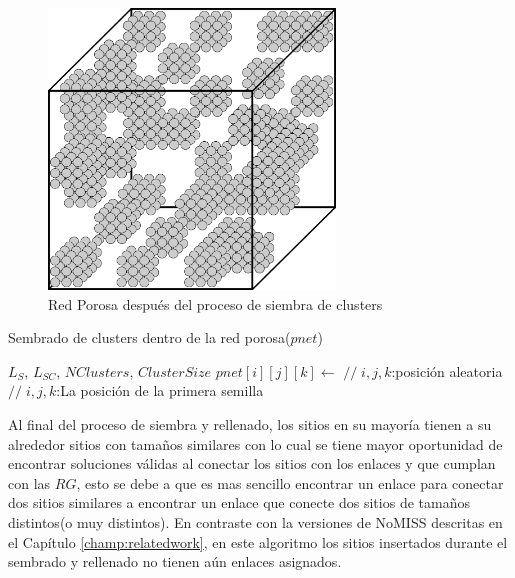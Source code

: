 \begin{figure}[h]
\centering
\includegraphics[width=3.0in]{img/cluster1.pdf}
\caption{Red Porosa después del proceso de siembra de clusters}
\label{fig:cluster1}
\end{figure}

\begin{algorithm}
\caption{Sembrado de clusters dentro de la red porosa($pnet$)}\label{alg:seedingalg}
\begin{algorithmic}[1]
\Require $L_S$, $L_{SC}$, $NClusters$, $ClusterSize$ 
\State $pnet[i][j][k] \gets $  {$//\;i,j,k$:posición aleatoria}
\State {}
\EndFor
\EndFor
{} {$//\;i,j,k$:La posición de la primera semilla}
	\State {}
\EndWhile
\end{algorithmic}
\end{algorithm}

Al final del proceso de siembra y rellenado, los sitios en su mayoría tienen a su alrededor sitios con tamaños similares con lo cual se tiene mayor oportunidad de encontrar soluciones válidas al conectar los sitios con los enlaces y que cumplan con las $RG$, esto se debe a que es mas sencillo encontrar un enlace para conectar dos sitios similares a encontrar un enlace que conecte dos sitios de tamaños distintos(o muy distintos). En contraste con la versiones de NoMISS descritas en el Capítulo \ref{champ:relatedwork}, en este algoritmo los sitios insertados durante el sembrado y rellenado no tienen aún enlaces asignados.\\

